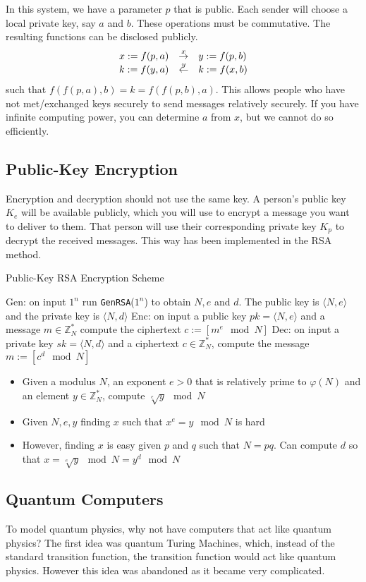 \documentclass[12 pt]{article}
\begin{document}
In this system, we have a parameter $p$ that is public. Each sender
will choose a local private key, say $a$ and $b$. These operations
must be commutative. The resulting functions can be disclosed
publicly.
$$
\begin{array}{l l l}
  x:=f(p,a)& \stackrel{x}{\to} & y:=f(p,b)
  \\ k:=f(y,a) & \stackrel{y}{\gets} & k:=f(x,b)
\end{array}
$$ such that $f(f(p,a),b) = k = f(f(p,b),a)$. This allows people who
have not met/exchanged keys securely to send messages relatively
securely. If you have infinite computing power, you can determine $a$
from $x$, but we cannot do so efficiently.
\subsection{Public-Key Encryption}
Encryption and decryption should not use the same key. A person's
public key $K_e$ will be available publicly, which you will use to
encrypt a message you want to deliver to them. That person will use
their corresponding private key $K_p$ to decrypt the received
messages. This way has been implemented in the RSA method.
\begin{algorithm}
  Public-Key RSA Encryption Scheme
  \begin{algorithmic}
    \State Gen: on input $1^n$ run \texttt{GenRSA}($1^n$) to obtain
    $N, e$ and $d$. The public key is $\langle N,e \rangle$ and the
    private key is $\langle N,d \rangle$
    \State Enc: on input a public key $pk = \langle N,e  \rangle$ and
    a message $m \in \mathbb{Z}^*_{N}$ compute the ciphertext $c :=
    [m^e \mod N]$
  \State Dec: on input a private key $sk = \langle N,d \rangle$ and a
  ciphertext $c \in \mathbb{Z}^*_{N}$, compute the message $m := [c^d
  \mod N]$
  \end{algorithmic}
\end{algorithm}
\begin{itemize}
\item
Given a modulus $N$, an exponent $e > 0$ that is relatively prime to
$\varphi (N)$ and an element $y \in \mathbb{Z}^*_{N}$, compute
$\sqrt[e]{y} \mod N$
\item Given $N,e,y$ finding $x$ such that $x^e = y \mod N$ is hard
\item However, finding $x$ is easy given $p$ and $q$ such that $N =
  pq$. Can compute $d$ so that $x = \sqrt[e]{y} \mod N = y^d \mod N$
\end{itemize}
\subsection{Quantum Computers}
To model quantum physics, why not have computers that act like quantum
physics? The first idea was quantum Turing Machines, which, instead of
the standard transition function, the transition function would act
like quantum physics. However this idea was abandoned as it became
very complicated.
\end{document}
